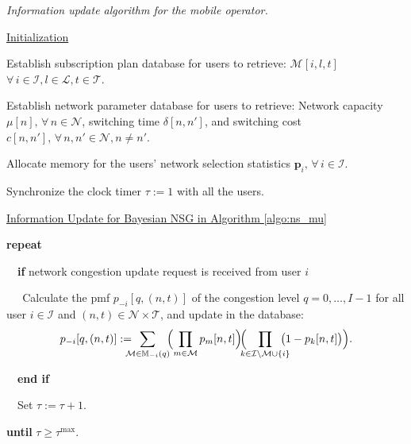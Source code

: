 \documentclass[journal]{IEEEtran}
\newcommand{\mc}[1]{\mathcal{#1}}
\newcommand{\bs}[1]{\boldsymbol{#1}}
\begin{document}
\begin{algorithm} [t] \small
\caption{\emph{Information update algorithm for the mobile operator.}}
\begin{algorithmic} [1] 

\STATEx \underline{Initialization}

\STATE Establish subscription plan database for users to retrieve: $\mathcal{M}[i,l,t]$ $\forall \, i \in \mathcal{I}, l \in \mathcal{L}, t \in \mathcal{T}$. 

\STATE Establish network parameter database for users to retrieve: Network capacity $\mu[n], \, \forall \, n \in \mathcal{N}$,  switching time $\delta[n,n']$, and switching cost $c[n,n'], \, \forall \, n,n' \in \mathcal{N}, n \neq n'$.

\STATE Allocate memory for the users' network selection statistics $\bs{p}_i, \, \forall \, i \in \mathcal{I}$.

\STATE Synchronize the clock timer $\tau := 1$ with all the users.



\STATEx \underline{Information Update for Bayesian NSG in Algorithm \ref{algo:ns_mu}} %

\STATE \textbf{repeat}

\STATE $ \ \ \ $ \textbf{if} network congestion update request is received from user $i$

\STATE $ \ \ \ \ \ $ Calculate the pmf $p_{-i}[q,(n,t)]$ of the congestion level \STATEx \quad\quad\quad $q = 0, \ldots, I-1$ for all user $i \in \mc{I}$ and $(n,t) \in \mathcal{N} \times \mathcal{T}$, \STATEx \quad\quad\quad and update in the database: %
%
\begin{equation} \label{equ:pqnt}
  p_{-i}[q,(n,t)] := \hspace{-0.3cm} \sum_{\mathcal{M} \in \mathbb{M}_{-i}(q)} \hspace{-0.1cm} \Bigl( \prod_{m \in \mathcal{M}} p_m[n,t] \Bigr) \! \Bigl( \hspace{-0.2cm} \prod_{k \in \mathcal{I} \backslash \mathcal{M} \cup \{i\}} \hspace{-0.3cm} \bigl(1 - p_k[n,t]\bigr) \Bigr). %
\end{equation}
%


\STATE $ \ \ \ $ \textbf{end if}

\STATE $ \ \ \ $ Set $\tau := \tau + 1$.

\STATE \textbf{until} $\tau \geq \tau^{\text{max}}$.

\end{algorithmic} \label{algo:ns_mo}
\end{algorithm}
\end{document}

